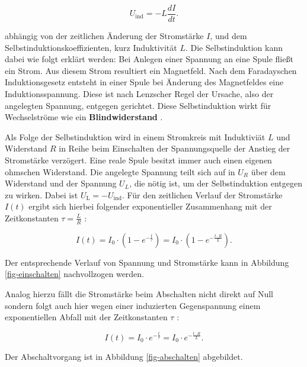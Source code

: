 \documentclass[page,pdftex,12pt,a4paper,twoside,openright]{scrbook}
\begin{document}
\begin{equation}
\label{eq-induktivitaet}
U_\mathrm{ind} = - L \frac{dI}{dt} .
\end{equation}

abhängig von der zeitlichen Änderung der Stromstärke \(I\), und dem Selbstinduktionskoeffizienten, kurz Induktivität \(L\). Die Selbstinduktion kann dabei wie folgt erklärt werden: Bei Anlegen einer Spannung an eine Spule fließt ein Strom. Aus diesem Strom resultiert ein Magnetfeld. Nach dem Faradayschen Induktionsgesetz entsteht in einer Spule bei Änderung des Magnetfeldes eine Induktionsspannung. Diese ist nach Lenzscher Regel der Ursache, also der angelegten Spannung, entgegen gerichtet. Diese Selbstinduktion wirkt für Wechselströme wie ein \textbf{Blindwiderstand} \cite{demtroder_experimentalphysik_2017}.

Als Folge der Selbstinduktion wird in einem Stromkreis mit Induktiviät \(L\) und Widerstand \(R\) in Reihe beim Einschalten der Spannungsquelle der Anstieg der Stromstärke verzögert. Eine reale Spule besitzt immer auch einen eigenen ohmschen Widerstand. Die angelegte Spannung teilt sich auf in \(U_R\) über dem Widerstand und der Spannung \(U_L\), die nötig ist, um der Selbstinduktion entgegen zu wirken. Dabei ist \(U_{\mathrm{L}} = - U_{\mathrm{ind}}\). Für den zeitlichen Verlauf der Stromstärke \(I(t)\) ergibt sich hierbei folgender exponentieller Zusammenhang mit der Zeitkonstanten \(\tau = \frac{L}{R}\) \cite{raith_elektromagnetismus_2006}:

\begin{equation}
\label{eq-strom-spule}
I(t) = I_{\mathrm{0}} \cdot (1 - e^{ -\frac{t}{\tau}})= I_{\mathrm{0}} \cdot (1- e^{ -\frac{t \cdot R}{L}}).
\end{equation}

Der entsprechende Verlauf von Spannung und Stromstärke kann in Abbildung \ref{fig-einschalten} nachvollzogen werden.

Analog hierzu fällt die Stromstärke beim Abschalten nicht direkt auf Null sondern folgt auch hier wegen einer induzierten Gegenspannung einem exponentiellen Abfall mit der Zeitkonstanten \(\tau\) \cite{raith_elektromagnetismus_2006}:

\begin{equation}
\label{eq-auschalten}
I(t) = I_{\mathrm{0}} \cdot e^{ -\frac{t}{\tau}}= I_{\mathrm{0}} \cdot e^{ -\frac{t \cdot R}{L}}.
\end{equation}

Der Abschaltvorgang ist in Abbildung \ref{fig-abschalten} abgebildet.
\end{document}
